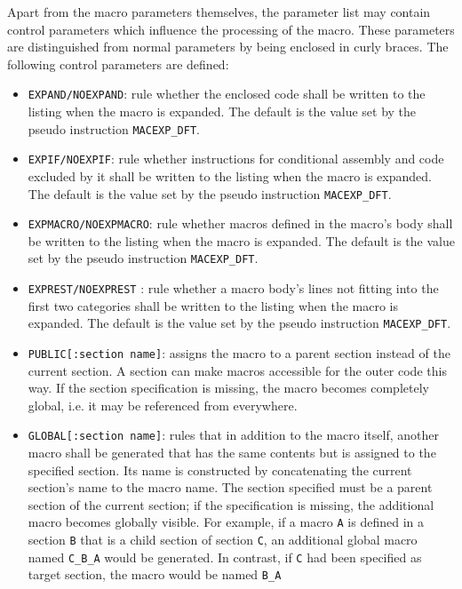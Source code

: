 \documentclass[12pt,twoside]{report}
\newcommand{\tty}[1]{{\tt #1}}
\begin{document}
Apart from the macro parameters themselves, the parameter list may
contain control parameters which influence the processing of the
macro.  These parameters are distinguished from normal parameters by
being enclosed in curly braces.  The following control parameters are
defined:
\begin{itemize}
\item{\tty{EXPAND/NOEXPAND}: rule whether the enclosed code shall
      be written to the listing when the macro is expanded.  The
      default is the value set by the pseudo instruction
      \tty{MACEXP\_DFT}.}
\item{\tty{EXPIF/NOEXPIF}: rule whether instructions for
      conditional assembly and code excluded by it shall
      be written to the listing when the macro is expanded.  The
      default is the value set by the pseudo instruction
      \tty{MACEXP\_DFT}.}
\item{\tty{EXPMACRO/NOEXPMACRO}: rule whether macros defined in
      the macro's body shall be written to the listing when the macro
      is expanded.  The default is the value set by the pseudo instruction
      \tty{MACEXP\_DFT}.}
\item{\tty{EXPREST/NOEXPREST} : rule whether a macro body's lines
      not fitting into the first two categories shall be written to the
      listing when the macro is expanded. The default is the value set by
      the pseudo instruction \tty{MACEXP\_DFT}.}
\item{\tty{PUBLIC[:section name]}: assigns the macro to a parent section
      instead of the current section.  A section can make macros
      accessible for the outer code this way.  If the section
      specification is missing, the macro becomes completely global, i.e.
      it may be referenced from everywhere.}
\item{\tty{GLOBAL[:section name]}: rules that in addition to the macro
      itself, another macro shall be generated that has the same contents
      but is assigned to the specified section.  Its name is constructed by
      concatenating the current section's name to the macro name.  The
      section specified must be a parent section of the current section;
      if the specification is missing, the additional macro becomes
      globally visible.  For example, if a macro \tty{A} is defined in a
      section \tty{B} that is a child section of section \tty{C}, an additional
      global macro named \tty{C\_B\_A} would be generated.  In contrast, if
      \tty{C} had been specified as target section, the macro would be named \tty{B\_A}
}
\end{itemize}
\end{document}

